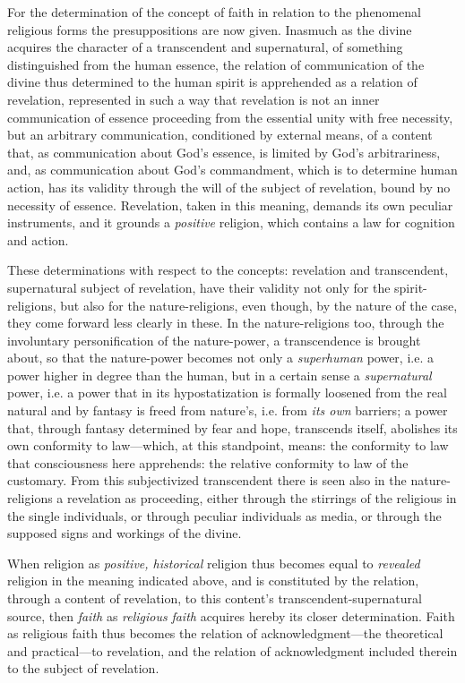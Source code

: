 \documentclass[12pt,a4paper]{book}
\begin{document}
For the determination of the concept of faith in relation to the phenomenal
religious forms the presuppositions are now given. Inasmuch as the divine acquires
the character of a transcendent and supernatural, of something distinguished from
the human essence, the relation of communication of the divine thus determined to
the human spirit is apprehended as a relation of revelation, represented in such a
way that revelation is not an inner communication of essence proceeding from the
essential unity with free necessity, but an arbitrary communication, conditioned
by external means, of a content that, as communication about God's essence, is
limited by God's arbitrariness, and, as communication about God's commandment,
which is to determine human action, has its validity through the will of the
subject of revelation, bound by no necessity of essence. Revelation, taken in this
meaning, demands its own peculiar instruments, and it grounds a \emph{positive}
religion, which contains a law for cognition and action.

These determinations with respect to the concepts: revelation and transcendent,
supernatural subject of revelation, have their validity not only for the
spirit-religions, but also for the nature-religions, even though, by the nature of
the case, they come forward less clearly in these. In the nature-religions too,
through the involuntary personification of the nature-power, a transcendence is
brought about, so that the nature-power becomes not only a \emph{superhuman}
power, i.e. a power higher in degree than the human, but in a certain sense a
\emph{supernatural} power, i.e. a power that in its hypostatization is formally
loosened from the real natural and by fantasy is freed from nature's, i.e. from
\emph{its own} barriers; a power that, through fantasy determined by fear and hope,
transcends itself, abolishes its own conformity to law---which, at this standpoint,
means: the conformity to law that consciousness here apprehends: the relative
conformity to law of the customary. From this subjectivized transcendent there is
seen also in the nature-religions a revelation as proceeding, either through the
stirrings of the religious in the single individuals, or through peculiar
individuals as media, or through the supposed signs and workings of the divine.

When religion as \emph{positive, historical} religion thus becomes equal to \emph{revealed}
religion in the meaning indicated above, and is constituted by the relation,
through a content of revelation, to this content's transcendent-supernatural
source, then \emph{faith} as \emph{religious} \emph{faith} acquires hereby its closer determination.
Faith as religious faith thus becomes the relation of acknowledgment---the
theoretical and practical---to revelation, and the relation of acknowledgment
included therein to the subject of revelation.
\end{document}
